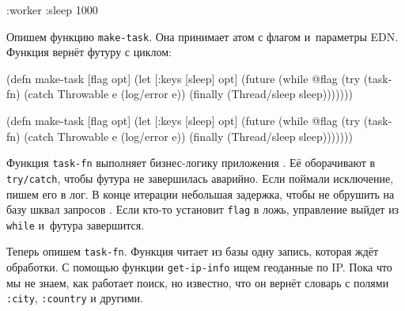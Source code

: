 \begin{english}
  \begin{clojure}
{:worker {:sleep 1000}}
  \end{clojure}
\end{english}


Опишем функцию \verb|make-task|. Она принимает атом с флагом и~параметры
EDN. Функция вернёт футуру с циклом:

\ifx\DEVICETYPE\MOBILE

\begin{english}
  \begin{clojure/lines}
(defn make-task
  [flag opt]
  (let [{:keys [sleep]} opt]
    (future
      (while @flag
        (try
          (task-fn)
          (catch Throwable e
            (log/error e))
          (finally
            (Thread/sleep
              sleep)))))))
  \end{clojure/lines}
\end{english}

\else

\begin{english}
  \begin{clojure/lines}
(defn make-task
  [flag opt]
  (let [{:keys [sleep]} opt]
    (future
      (while @flag
        (try
          (task-fn)
          (catch Throwable e
            (log/error e))
          (finally
            (Thread/sleep sleep)))))))
  \end{clojure/lines}
\end{english}

\fi

Функция \verb|task-fn| выполняет бизнес-логику приложения . Её
оборачивают в \verb|try/catch|, чтобы футура не завершилась аварийно. Если
поймали исключение, пишем его в лог. В конце итерации небольшая задержка, чтобы
не обрушить на базу шквал запросов . Если кто-то установит
\verb|flag| в ложь, управление выйдет из \verb|while| и~футура завершится.

Теперь опишем \verb|task-fn|. Функция читает из базы одну запись, которая
ждёт обработки. С помощью функции \verb|get-ip-info| ищем геоданные по
IP. Пока что мы не знаем, как работает поиск, но известно, что он вернёт словарь
с полями \verb|:city|, \verb|:country| и другими.


\ifx\DEVICETYPE\MOBILE

